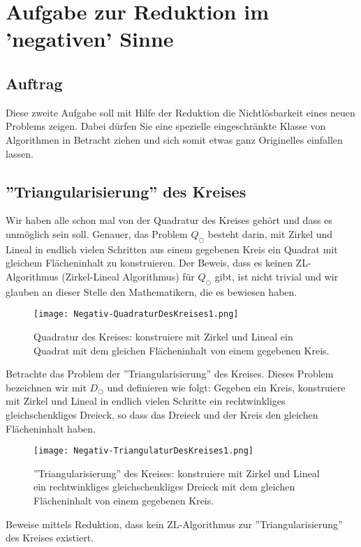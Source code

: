 \documentclass[
	12pt, %
	german, %
]{fphw}
\begin{document}
\section*{Aufgabe zur Reduktion im 'negativen' Sinne}

\subsection*{Auftrag} Diese zweite Aufgabe soll mit Hilfe der Reduktion die Nichtlösbarkeit eines neuen Problems zeigen. Dabei dürfen Sie eine spezielle eingeschränkte Klasse von Algorithmen in Betracht ziehen und sich somit etwas ganz Originelles einfallen lassen.

\begin{problem}
\subsection*{''Triangularisierung'' des Kreises}
Wir haben alle schon mal von der Quadratur des Kreises gehört und dass es unmöglich sein soll. Genauer, das Problem \(Q_{\bigcirc}\) besteht darin, mit Zirkel und Lineal in endlich vielen Schritten aus einem gegebenen Kreis ein Quadrat mit gleichem Flächeninhalt zu konstruieren. Der Beweis, dass es keinen ZL-Algorithmus (Zirkel-Lineal Algorithmus) für \(Q_{\bigcirc}\) gibt, ist nicht trivial und wir glauben an dieser Stelle den Mathematikern, die es bewiesen haben.

\begin{figure}[H]
	\centering
	\texttt{[image: Negativ-QuadraturDesKreises1.png]}
	\caption{Quadratur des Kreises: konstruiere mit Zirkel und Lineal ein Quadrat mit dem gleichen Flächeninhalt von einem gegebenen Kreis.}
\end{figure}

Betrachte das Problem der ''Triangularisierung'' des Kreises. Dieses Problem bezeichnen wir mit \(D_{\bigcirc}\) und definieren wie folgt: Gegeben ein Kreis, konstruiere mit Zirkel und Lineal in endlich vielen Schritte ein rechtwinkliges gleichschenkliges Dreieck, so dass das Dreieck und der Kreis den gleichen Flächeninhalt haben.
\begin{figure}[H]
	\centering
	\texttt{[image: Negativ-TriangulaturDesKreises1.png]}
	\caption{''Triangularisierung'' des Kreises: konstruiere mit Zirkel und Lineal ein rechtwinkliges gleichschenkliges Dreieck mit dem gleichen Flächeninhalt von einem gegebenen Kreis.}
\end{figure}
Beweise mittels Reduktion, dass kein ZL-Algorithmus zur ''Triangularisierung'' des Kreises existiert.
\end{problem}
\end{document}

